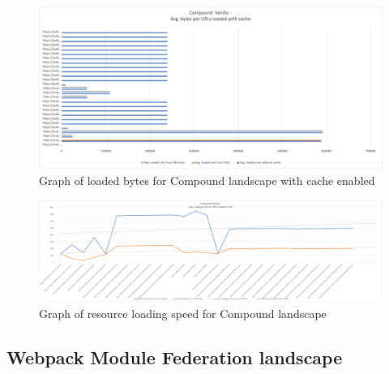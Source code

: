 \newpage
\begin{figure}[!h]
	\centering
	\includegraphics[width=1.4\textwidth, angle=90]{Figures/compound_bytes_cache.png}
	\caption{Graph of loaded bytes for Compound landscape with cache enabled}
	\label{fig:appendix_1_24}
\end{figure}
\newpage
\begin{figure}[!h]
	\centering
	\includegraphics[width=1.4\textwidth, angle=90]{Figures/compound_speed.png}
	\caption{Graph of resource loading speed for Compound landscape}
	\label{fig:appendix_1_25}
\end{figure}
\newpage

\subsection{Webpack Module Federation landscape}

